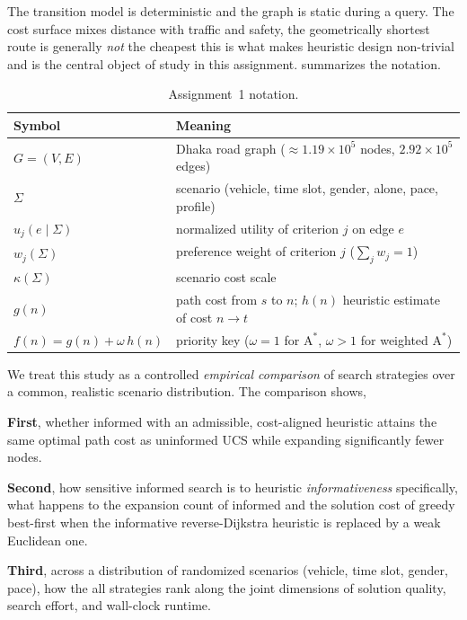 \documentclass{ai-lab-report}
\begin{document}
The transition model is deterministic and the graph is static during a query. 
The cost surface mixes distance with traffic and safety, the geometrically shortest route is generally \emph{not} the cheapest this is what makes heuristic design non-trivial and is the central object of study in this assignment.  summarizes the notation.

\begin{table}[H]
\centering
\small
\begin{tabularx}{\linewidth}{@{}lX@{}}
\toprule
Symbol & Meaning \\
\midrule
$G=(V,E)$ & Dhaka road graph ($\approx1.19\times10^{5}$ nodes, $2.92\times10^{5}$ edges) \\
$\Sigma$ & scenario (vehicle, time slot, gender, alone, pace, profile) \\
$u_j(e\mid\Sigma)$ & normalized utility of criterion $j$ on edge $e$ \\
$w_j(\Sigma)$ & preference weight of criterion $j$ ($\sum_j w_j=1$) \\
$\kappa(\Sigma)$ & scenario cost scale \\
$g(n)$ & path cost from $s$ to $n$; $h(n)$ heuristic estimate of cost $n\!\to\!t$ \\
$f(n)=g(n)+\omega\,h(n)$ & priority key ($\omega{=}1$ for $\text{A}^\ast$, $\omega{>}1$ for weighted $\text{A}^\ast$) \\
\bottomrule
\end{tabularx}
\caption{Assignment~1 notation.}
\label{tab:a1notation}
\end{table}

We treat this study as a controlled \emph{empirical comparison} of search strategies over a common, 
realistic scenario distribution. The comparison shows, 

\textbf{First}, whether informed with an admissible, cost-aligned heuristic attains the same optimal path cost as uninformed UCS while 
expanding significantly fewer nodes. 

\textbf{Second}, how sensitive informed search is to heuristic \emph{informativeness} specifically, 
what happens to the expansion count of informed and the solution cost of greedy best-first when the informative reverse-Dijkstra 
heuristic is replaced by a weak Euclidean one. 

\textbf{Third}, across a distribution of randomized scenarios (vehicle, time slot, gender, pace), how the all strategies rank
 along the joint dimensions of solution quality, search effort, and wall-clock runtime.
\end{document}
